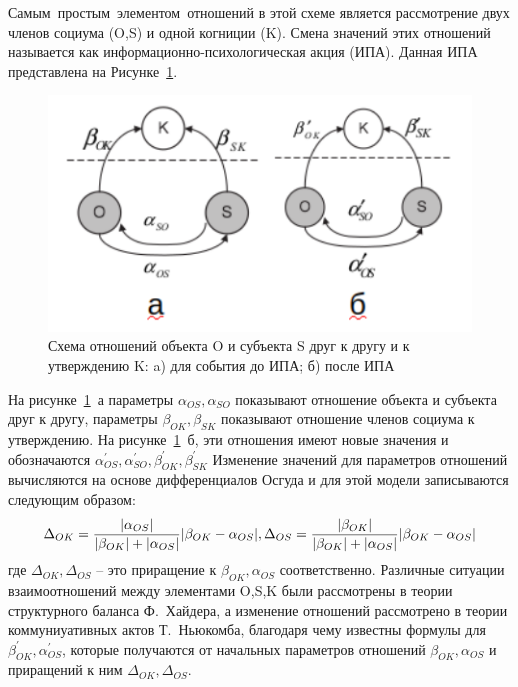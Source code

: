 Самым~простым~элементом~отношений в этой схеме является рассмотрение двух членов социума (O,S) и одной когниции (K).
Смена значений этих отношений называется как информационно-психологическая акция (ИПА).
Данная ИПА представлена на Рисунке~\ref{fig:shema_OSK}.
\begin{figure}[h!]
    \centering
    \captionsetup{justification=centering}
    \includegraphics[width=0.7\linewidth]{pictures/schema_OSK.png}
    \caption{Схема отношений объекта O и субъекта S друг к другу и к утверждению K: a)
    для события до ИПА; б) после ИПА~\citep{pilkevich2015model}}
    \label{fig:shema_OSK}
\end{figure}

На рисунке~\ref{fig:shema_OSK}~а параметры $\alpha_{OS}, \alpha_{SO}$ показывают отношение объекта и субъекта
друг к другу, параметры $\beta_{OK}, \beta_{SK}$ показывают отношение членов социума к утверждению.
На рисунке~\ref{fig:shema_OSK}~б, эти отношения имеют новые значения и обозначаются
$\alpha^{\prime}_{OS}, \alpha^{\prime}_{SO}, \beta^{\prime}_{OK}, \beta^{\prime}_{SK}$
Изменение значений для параметров отношений вычисляются на основе дифференциалов Осгуда и для этой модели
записываются следующим образом:
\begin{equation}
    \Delta_{OK} = \frac{|\alpha_{OS}|}{|\beta_{OK}|+|\alpha_{OS}|} |\beta_{OK}-\alpha_{OS}|,\\
    \Delta_{OS} = \frac{|\beta_{OK}|}{|\beta_{OK}|+|\alpha_{OS}|} |\beta_{OK}-\alpha_{OS}|
\end{equation}
где $\Delta_{OK}, \Delta_{OS}$ – это приращение к $\beta_{OK}, \alpha_{OS}$ соответственно.
Различные ситуации взаимоотношений между элементами {O,S,K} были рассмотрены в теории структурного
баланса Ф.~Хайдера, а изменение отношений рассмотрено в теории коммуниуативных актов Т.~Ньюкомба,
благодаря чему известны формулы для $\beta^{\prime}_{OK}, \alpha^{\prime}_{OS}$, которые получаются
от начальных параметров отношений $\beta_{OK}, \alpha_{OS}$ и приращений к ним $\Delta_{OK}, \Delta_{OS}$.

